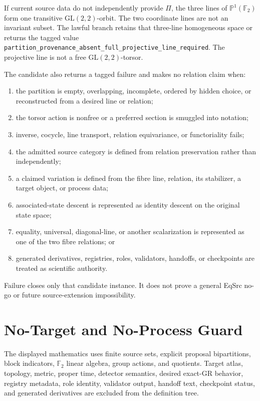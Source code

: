\documentclass[11pt]{article}
\newcommand{\Ftwo}{\mathbb F_2}
\begin{document}
If current source data do not independently provide \(\Pi\), the three lines
of \(\mathbb P^1(\Ftwo)\) form one transitive
\(\mathrm{GL}(2,2)\)-orbit. The two coordinate lines are not an invariant
subset. The lawful branch retains that three-line homogeneous space or
returns the tagged value
\texttt{partition\_provenance\_absent\_full\_projective\_line\_required}.
The projective line is not a free \(\mathrm{GL}(2,2)\)-torsor.

The candidate also returns a tagged failure and makes no relation claim when:
\begin{enumerate}[leftmargin=*]
  \item the partition is empty, overlapping, incomplete, ordered by hidden
  choice, or reconstructed from a desired line or relation;
  \item the torsor action is nonfree or a preferred section is smuggled into
  notation;
  \item inverse, cocycle, line transport, relation equivariance, or
  functoriality fails;
  \item the admitted source category is defined from relation preservation
  rather than independently;
  \item a claimed variation is defined from the fibre line, relation, its
  stabilizer, a target object, or process data;
  \item associated-state descent is represented as identity descent on the
  original state space;
  \item equality, universal, diagonal-line, or another scalarization is
  represented as one of the two fibre relations; or
  \item generated derivatives, registries, roles, validators, handoffs, or
  checkpoints are treated as scientific authority.
\end{enumerate}

Failure closes only that candidate instance. It does not prove a general
EqSrc no-go or future source-extension impossibility.

\section{No-Target and No-Process Guard}

The displayed mathematics uses finite source sets, explicit proposal
bipartitions, block indicators, \(\Ftwo\) linear algebra, group actions, and
quotients. Target atlas, topology, metric, proper time, detector semantics,
desired exact-GR behavior, registry metadata, role identity, validator
output, handoff text, checkpoint status, and generated derivatives are
excluded from the definition tree.
\end{document}
